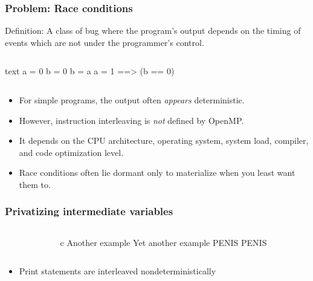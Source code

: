 \documentclass[handout]{beamer}
\begin{document}
\begin{frame}[fragile]
  \frametitle{Problem: Race conditions}
  Definition: A class of bug where the program's output depends on the timing of events which are not under the programmer's control.  
  \begin{columns}[t]%
    \begin{column}{0.5\textwidth}
      \begin{ccode}[]
        {text}
        a = 0
        b = 0
        b = a
        a = 1
          ==> (b == 0)\end{ccode}
    \end{column}
  \end{columns}
  \pause
  \begin{itemize}
  \item For simple programs, the output often \emph{appears} deterministic.
  \item However, instruction interleaving is \emph{not} defined by OpenMP.
  \item It depends on the CPU architecture, operating system, system load, compiler, and code optimization level.
  \item Race conditions often lie dormant only to materialize when you least want them to.
  \end{itemize}

\end{frame}


\begin{frame}[fragile]
  \frametitle{Privatizing intermediate variables}
  \begin{columns}[t]%
    \begin{column}{0.65\textwidth}
    \end{column}
    \pause
    \begin{column}{0.4\textwidth}
      \begin{ccode}[]
        {c}
        Another example
        Yet another example
        PENIS
        PENIS
      \end{ccode}
    \end{column}
  \end{columns}
  \pause
  \begin{itemize}
  \item Print statements are interleaved nondeterministically
  \end{itemize}
\end{frame}
\end{document}
